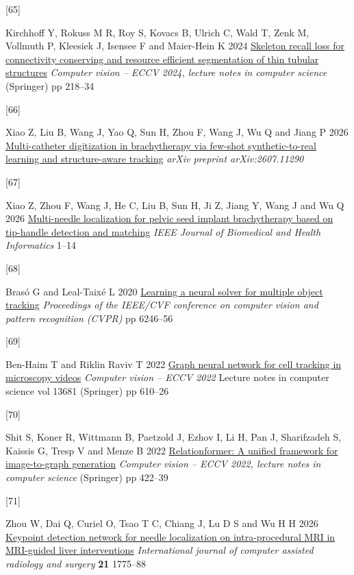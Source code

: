 \documentclass[
  11pt,
]{article}
\newlength{\cslhangindent}
\newlength{\csllabelwidth}
\newenvironment{CSLReferences}[2] %
 {\begin{list}{}{%
  \setlength{\itemindent}{0pt}
  \setlength{\leftmargin}{0pt}
  \setlength{\parsep}{0pt}
  \ifodd #1
   \setlength{\leftmargin}{\cslhangindent}
   \setlength{\itemindent}{-1\cslhangindent}
  \fi
  \setlength{\itemsep}{#2\baselineskip}}}
 {\end{list}}
\newcommand{\CSLLeftMargin}[1]{\parbox[t]{\csllabelwidth}{\strut#1\strut}}
\newcommand{\CSLRightInline}[1]{\parbox[t]{\linewidth - \csllabelwidth}{\strut#1\strut}}
\begin{document}
\begin{CSLReferences}{0}{1}
\CSLLeftMargin{{[}65{]} }%
\CSLRightInline{Kirchhoff Y, Rokuss M R, Roy S, Kovacs B, Ulrich C, Wald
T, Zenk M, Vollmuth P, Kleesiek J, Isensee F and Maier-Hein K 2024
\href{https://doi.org/10.1007/978-3-031-72980-5_13}{Skeleton recall loss
for connectivity conserving and resource efficient segmentation of thin
tubular structures} \emph{Computer vision -- ECCV 2024, lecture notes in
computer science} (Springer) pp 218--34}

\CSLLeftMargin{{[}66{]} }%
\CSLRightInline{Xiao Z, Liu B, Wang J, Yao Q, Sun H, Zhou F, Wang J, Wu
Q and Jiang P 2026
\href{https://arxiv.org/abs/2607.11290}{Multi-catheter digitization in
brachytherapy via few-shot synthetic-to-real learning and
structure-aware tracking} \emph{arXiv preprint arXiv:2607.11290}}

\CSLLeftMargin{{[}67{]} }%
\CSLRightInline{Xiao Z, Zhou F, Wang J, He C, Liu B, Sun H, Ji Z, Jiang
Y, Wang J and Wu Q 2026
\href{https://doi.org/10.1109/JBHI.2026.3694701}{Multi-needle
localization for pelvic seed implant brachytherapy based on tip-handle
detection and matching} \emph{IEEE Journal of Biomedical and Health
Informatics} 1--14}

\CSLLeftMargin{{[}68{]} }%
\CSLRightInline{Brasó G and Leal-Taixé L 2020
\href{https://doi.org/10.1109/CVPR42600.2020.00628}{Learning a neural
solver for multiple object tracking} \emph{Proceedings of the IEEE/CVF
conference on computer vision and pattern recognition (CVPR)} pp
6246--56}

\CSLLeftMargin{{[}69{]} }%
\CSLRightInline{Ben-Haim T and Riklin Raviv T 2022
\href{https://doi.org/10.1007/978-3-031-19803-8_36}{Graph neural network
for cell tracking in microscopy videos} \emph{Computer vision -- ECCV
2022} Lecture notes in computer science vol 13681 (Springer) pp 610--26}

\CSLLeftMargin{{[}70{]} }%
\CSLRightInline{Shit S, Koner R, Wittmann B, Paetzold J, Ezhov I, Li H,
Pan J, Sharifzadeh S, Kaissis G, Tresp V and Menze B 2022
\href{https://doi.org/10.1007/978-3-031-19836-6_24}{Relationformer: A
unified framework for image-to-graph generation} \emph{Computer vision
-- ECCV 2022, lecture notes in computer science} (Springer) pp 422--39}

\CSLLeftMargin{{[}71{]} }%
\CSLRightInline{Zhou W, Dai Q, Curiel O, Tsao T C, Chiang J, Lu D S and
Wu H H 2026 \href{https://doi.org/10.1007/s11548-026-03592-5}{Keypoint
detection network for needle localization on intra-procedural MRI in
MRI-guided liver interventions} \emph{International journal of computer
assisted radiology and surgery} \textbf{21} 1775--88}


\end{CSLReferences}
\end{document}
